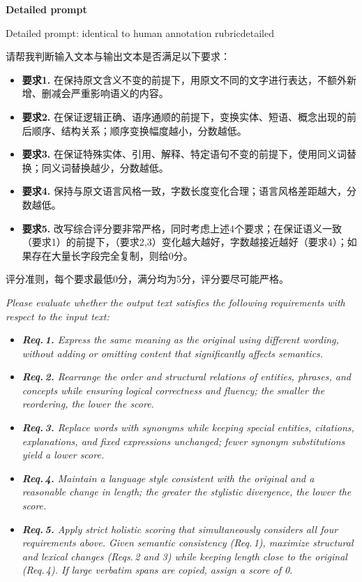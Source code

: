 \documentclass[11pt]{article}
\begin{document}
\begin{table}[t]
\medskip
\noindent\textbf{Detailed prompt}
\medskip
\begin{prompttextbox}{Detailed prompt: identical to human annotation rubric}{detailed}
\small
\begin{minipage}[t]{0.47\linewidth}
请帮我判断输入文本与输出文本是否满足以下要求：
\begin{itemize}[leftmargin=1.2em,itemsep=2pt,topsep=2pt]
  \item \textbf{要求1.} 在保持原文含义不变的前提下，用原文不同的文字进行表达，不额外新增、删减会严重影响语义的内容。
  \item \textbf{要求2.} 在保证逻辑正确、语序通顺的前提下，变换实体、短语、概念出现的前后顺序、结构关系；顺序变换幅度越小，分数越低。
  \item \textbf{要求3.} 在保证特殊实体、引用、解释、特定语句不变的前提下，使用同义词替换；同义词替换越少，分数越低。
  \item \textbf{要求4.} 保持与原文语言风格一致，字数长度变化合理；语言风格差距越大，分数越低。
  \item \textbf{要求5.} 改写综合评分要非常严格，同时考虑上述4个要求；在保证语义一致（要求1）的前提下，（要求2,3）变化越大越好，字数越接近越好（要求4）；如果存在大量长字段完全复制，则给0分。
\end{itemize}

\medskip
评分准则，每个要求最低0分，满分均为5分，评分要尽可能严格。
\end{minipage}%
\hfill\vrule\hfill%
\begin{minipage}[t]{0.47\linewidth}
\textit{Please evaluate whether the output text satisfies the following requirements with respect to the input text:}
\begin{itemize}[leftmargin=1.2em,itemsep=2pt,topsep=2pt]
  \item \textit{\textbf{Req.\,1.} Express the same meaning as the original using different wording, without adding or omitting content that significantly affects semantics.}
  \item \textit{\textbf{Req.\,2.} Rearrange the order and structural relations of entities, phrases, and concepts while ensuring logical correctness and fluency; the smaller the reordering, the lower the score.}
  \item \textit{\textbf{Req.\,3.} Replace words with synonyms while keeping special entities, citations, explanations, and fixed expressions unchanged; fewer synonym substitutions yield a lower score.}
  \item \textit{\textbf{Req.\,4.} Maintain a language style consistent with the original and a reasonable change in length; the greater the stylistic divergence, the lower the score.}
  \item \textit{\textbf{Req.\,5.} Apply strict holistic scoring that simultaneously considers all four requirements above. Given semantic consistency (Req.\,1), maximize structural and lexical changes (Reqs.\,2 and 3) while keeping length close to the original (Req.\,4). If large verbatim spans are copied, assign a score of 0.}
\end{itemize}


\end{minipage}
\end{prompttextbox}
\end{table}
\end{document}
